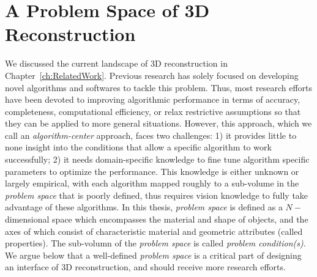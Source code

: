 
\chapter{A Problem Space of 3D Reconstruction}
\label{ch:3DRecon_ProbSpace}
We discussed the current landscape of 3D reconstruction in Chapter~\ref{ch:RelatedWork}. Previous research has solely focused on developing novel algorithms and softwares to tackle this problem. Thus, most research efforts have been devoted to improving algorithmic performance in terms of accuracy, completeness, computational efficiency, or relax restrictive assumptions so that they can be applied to more general situations. However, this approach, which we call an \textit{algorithm-center} approach, faces two challenges: 1) it provides little to none insight into the conditions that allow a specific algorithm to work successfully; 2) it needs domain-specific knowledge to fine tune algorithm specific parameters to optimize the performance. This knowledge is either unknown or largely empirical, with each algorithm mapped roughly to a sub-volume in the \textit{problem space} that is poorly defined, thus requires vision knowledge to fully take advantage of these algorithms. In this thesis, \textit{problem space} is defined as a $N-$dimensional space which encompasses the material and shape of objects, and the axes of which consist of characteristic material and geometric attributes (called properties). The sub-volumn of the \textit{problem space} is called \textit{problem condition(s)}. We argue below that a well-defined \textit{problem space} is a critical part of designing an interface of 3D reconstruction, and should receive more research efforts.


